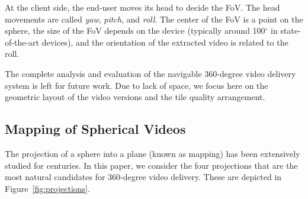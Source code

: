 \documentclass{sig-alternate}
\begin{document}
At the client side, the end-user moves its head to decide the \ac{FoV}. The head movements
are called \emph{yaw}, \emph{pitch}, and \emph{roll}. The center of the \ac{FoV} is a 
point on the sphere, the size of the \ac{FoV} depends on the device (typically
around 100$^\circ$ in state-of-the-art devices), and the orientation of the extracted video 
is related to the roll.

The complete analysis and evaluation of the navigable 360-degree video delivery system
is left for future work. Due to lack of space, we focus here on the geometric layout
of the video versions and the tile quality arrangement.


\subsection{Mapping of Spherical Videos}

The projection of a sphere into a plane (known as mapping) has been extensively studied
for centuries. In this paper, we consider the four projections that are the most natural
candidates for 360-degree video delivery. These are depicted in Figure~\ref{fig:projections}.
\end{document}

